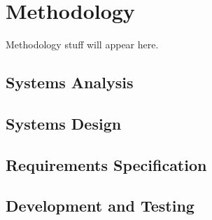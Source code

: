 \chapter{Methodology}

Methodology stuff will appear here.


\section{Systems Analysis}

\section{Systems Design}

\section{Requirements Specification}

\section{Development and Testing}
